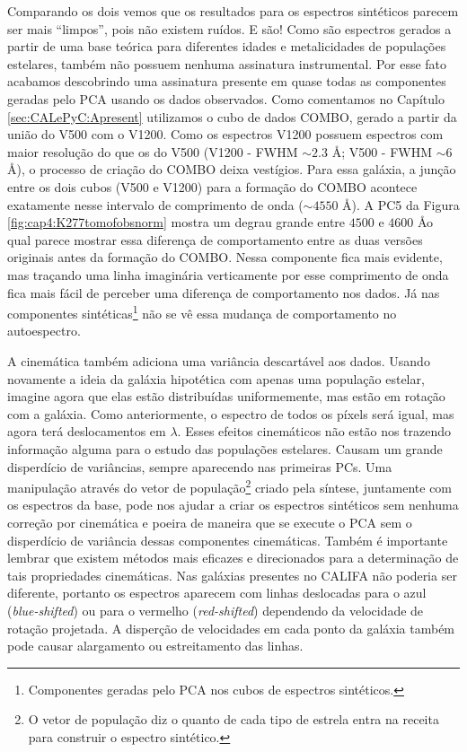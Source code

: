 Comparando os dois vemos que os resultados para os espectros sintéticos parecem ser mais ``limpos'', pois não existem
ruídos. E são! Como são espectros gerados a partir de uma base teórica para diferentes idades e metalicidades de
populações estelares, também não possuem nenhuma assinatura instrumental. Por esse fato acabamos descobrindo uma
assinatura presente em quase todas as componentes geradas pelo PCA usando os dados observados. Como comentamos no
Capítulo \ref{sec:CALePyC:Apresent} utilizamos o cubo de dados COMBO, gerado a partir da união do V500 com o V1200. Como
os espectros V1200 possuem espectros com maior resolução do que os do V500 (V1200 - FWHM $\sim 2.3$ \AA; V500 - FWHM
$\sim 6$ \AA), o processo de criação do COMBO deixa vestígios. Para essa galáxia, a junção entre os dois cubos (V500 e
V1200) para a formação do COMBO acontece exatamente nesse intervalo de comprimento de onda ($\sim 4550$ \AA). A PC5 da
Figura \ref{fig:cap4:K277tomofobsnorm} mostra um degrau grande entre $4500$ e $4600$ \AA o qual parece mostrar essa
diferença de comportamento entre as duas versões originais antes da formação do COMBO. Nessa componente fica mais
evidente, mas traçando uma linha imaginária verticamente por esse comprimento de onda fica mais fácil de perceber uma
diferença de comportamento nos dados. Já nas componentes sintéticas\footnote{Componentes geradas pelo PCA nos cubos de
espectros sintéticos.} não se vê essa mudança de comportamento no autoespectro.

A cinemática também adiciona uma variância descartável aos dados. Usando novamente a ideia da galáxia hipotética com
apenas uma população estelar, imagine agora que elas estão distribuídas uniformemente, mas estão em rotação com a
galáxia. Como anteriormente, o espectro de todos os píxels será igual, mas agora terá deslocamentos em $\lambda$. Esses
efeitos cinemáticos não estão nos trazendo informação alguma para o estudo das populações estelares. Causam um grande
disperdício de variâncias, sempre aparecendo nas primeiras PCs. Uma manipulação através do vetor de população\footnote{O
vetor de população diz o quanto de cada tipo de estrela entra na receita para construir o espectro sintético.} criado
pela síntese, juntamente com os espectros da base, pode nos ajudar a criar os espectros sintéticos sem nenhuma correção
por cinemática e poeira de maneira que se execute o PCA sem o disperdício de variância dessas componentes cinemáticas.
Também é importante lembrar que existem métodos mais eficazes e direcionados para a determinação de tais propriedades
cinemáticas. Nas galáxias presentes no CALIFA não poderia ser diferente, portanto os espectros aparecem com linhas
deslocadas para o azul ({\em blue-shifted}) ou para o vermelho ({\em red-shifted}) dependendo da velocidade de rotação
projetada. A disperção de velocidades em cada ponto da galáxia também pode causar alargamento ou estreitamento das
linhas.

